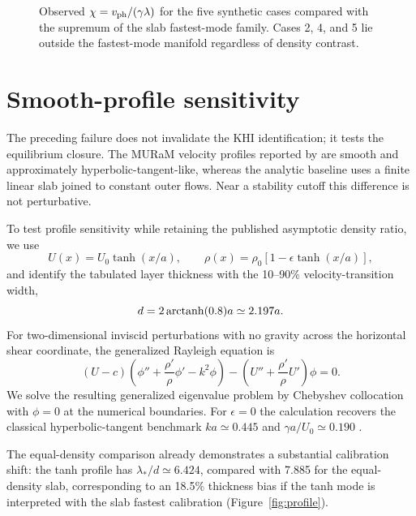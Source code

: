 \documentclass[linenumbers]{aastex7}
\begin{document}
\begin{figure}
\caption{Observed $\chi=v_{\rm ph}/(\gamma\lambda)$ for the five synthetic cases compared with the supremum of the slab fastest-mode family. Cases 2, 4, and 5 lie outside the fastest-mode manifold regardless of density contrast.}
\label{fig:chi-cases}
\end{figure}

\section{Smooth-profile sensitivity}
The preceding failure does not invalidate the KHI identification; it tests the equilibrium closure. The MURaM velocity profiles reported by \citet{Kuridze2026} are smooth and approximately hyperbolic-tangent-like, whereas the analytic baseline uses a finite linear slab joined to constant outer flows. Near a stability cutoff this difference is not perturbative.

To test profile sensitivity while retaining the published asymptotic density ratio, we use
\begin{equation}
U(x)=U_0\tanh(x/a),\qquad
\rho(x)=\rho_0\left[1-\epsilon\tanh(x/a)\right],
\end{equation}
and identify the tabulated layer thickness with the 10--90\% velocity-transition width,
\begin{equation}
d=2\,{\rm arctanh}(0.8)a\simeq2.197a.
\end{equation}
For two-dimensional inviscid perturbations with no gravity across the horizontal shear coordinate, the generalized Rayleigh equation is \citep{Charru2011}
\begin{equation}
(U-c)\left(\phi''+\frac{\rho'}{\rho}\phi'-k^2\phi\right)
-\left(U''+\frac{\rho'}{\rho}U'\right)\phi=0.
\end{equation}
We solve the resulting generalized eigenvalue problem by Chebyshev collocation with $\phi=0$ at the numerical boundaries. For $\epsilon=0$ the calculation recovers the classical hyperbolic-tangent benchmark $ka\simeq0.445$ and $\gamma a/U_0\simeq0.190$ \citep{Michalke1964}.

The equal-density comparison already demonstrates a substantial calibration shift: the tanh profile has $\lambda_\ast/d\simeq6.424$, compared with 7.885 for the equal-density slab, corresponding to an 18.5\% thickness bias if the tanh mode is interpreted with the slab fastest calibration (Figure~\ref{fig:profile}).
\end{document}
